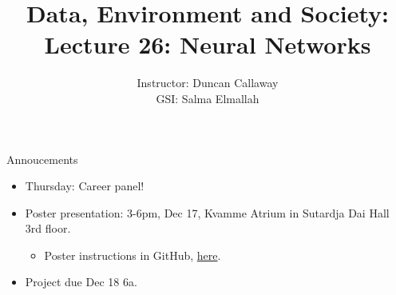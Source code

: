 \documentclass[mathserif, aspectratio=169]{beamer}
\title[Lecture 26] 
{Data, Environment and Society: \\{Lecture 26: Neural Networks}}
\author[ER131: Data, Environment and Society] 
{Instructor: Duncan Callaway\\
GSI: Salma Elmallah}
\institute[UC Berkeley] %
 {\small{ \bf December 3, 2019}}
\date[December 3, 2019]
\begin{document}
\frame{
	\titlepage
}

\begin{frame}{Annoucements}

\begin{itemize}
	\item Thursday: Career panel!  
	\item Poster presentation: 3-6pm, Dec 17, Kvamme Atrium in Sutardja Dai Hall 3rd floor.
	\begin{itemize}
		\item Poster instructions in GitHub, \href{https://github.com/duncancallaway/ER131_2019/tree/master/poster}{here}.
	\end{itemize}
	\item Project due Dec 18 6a.  
\end{itemize}

\end{frame}
\end{document}
